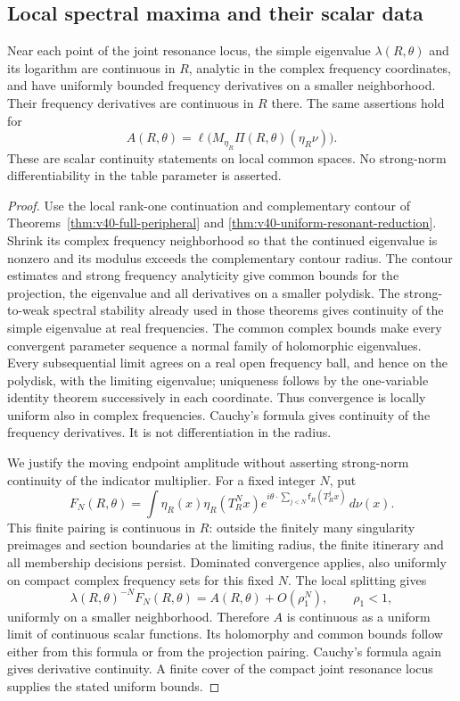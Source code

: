 \subsection{Local spectral maxima and their scalar data}
\begin{lemma}
\label{lem:v41-scalar-continuity}
Near each point of the joint resonance locus, the simple eigenvalue
$\lambda(R,\theta)$ and its logarithm are continuous in $R$, analytic
in the complex frequency coordinates, and have uniformly bounded
frequency derivatives on a smaller neighborhood. Their frequency
derivatives are continuous in $R$ there. The same assertions hold for
\[
 A(R,\theta)=\ell\bigl(M_{\eta_R}\Pi(R,\theta)(\eta_R\nu)\bigr).
\]
These are scalar continuity statements on local common spaces. No
strong-norm differentiability in the table parameter is asserted.
\end{lemma}
\begin{proof}
Use the local rank-one continuation and complementary contour of
Theorems~\ref{thm:v40-full-peripheral} and
\ref{thm:v40-uniform-resonant-reduction}. Shrink its complex frequency
neighborhood so that the continued eigenvalue is nonzero and its
modulus exceeds the complementary contour radius. The contour estimates
and strong frequency analyticity give common bounds for the projection,
the eigenvalue and all derivatives on a smaller polydisk. The
strong-to-weak spectral stability already used in those theorems gives
continuity of the simple eigenvalue at real frequencies. The common
complex bounds make every convergent parameter sequence a normal family
of holomorphic eigenvalues. Every subsequential limit agrees on a real
open frequency ball, and hence on the polydisk, with the limiting
eigenvalue; uniqueness follows by the one-variable identity theorem
successively in each coordinate. Thus convergence is locally uniform
also in complex frequencies. Cauchy's formula gives continuity of the
frequency derivatives. It is not differentiation in the radius.

We justify the moving endpoint amplitude without asserting strong-norm
continuity of the indicator multiplier. For a fixed integer $N$, put
\[
 F_N(R,\theta)=\int\eta_R(x)\eta_R(T_R^Nx)
     e^{i\theta\cdot\sum_{j<N}\mathsf f_R(T_R^jx)}\,d\nu(x).
\]
This finite pairing is continuous in $R$: outside the finitely many
singularity preimages and section boundaries at the limiting radius,
the finite itinerary and all membership decisions persist. Dominated
convergence applies, also uniformly on compact complex frequency sets
for this fixed $N$. The local splitting gives
\[
 \lambda(R,\theta)^{-N}F_N(R,\theta)
     =A(R,\theta)+O(\rho_1^N),\qquad \rho_1<1,
\]
uniformly on a smaller neighborhood. Therefore $A$ is continuous as a
uniform limit of continuous scalar functions. Its holomorphy and common
bounds follow either from this formula or from the projection pairing.
Cauchy's formula again gives derivative continuity. A finite cover of
the compact joint resonance locus supplies the stated uniform bounds.
\end{proof}


